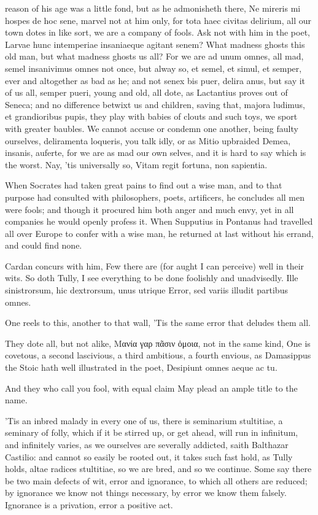 {reason of his age was a little fond, but as he admonisheth there, Ne
mireris mi hospes de hoc sene, marvel not at him only, for tota haec
civitas delirium, all our town dotes in like sort, we are a
company of fools. Ask not with him in the poet, Larvae hunc
intemperiae insaniaeque agitant senem? What madness ghosts this old
man, but what madness ghosts us all? For we are ad unum omnes, all mad,
semel insanivimus omnes not once, but alway so, et semel, et simul, et
semper, ever and altogether as bad as he; and not senex bis puer,
delira anus, but say it of us all, semper pueri, young and old, all
dote, as Lactantius proves out of Seneca; and no difference betwixt us
and children, saving that, majora ludimus, et grandioribus pupis, they
play with babies of clouts and such toys, we sport with greater
baubles. We cannot accuse or condemn one another, being faulty
ourselves, deliramenta loqueris, you talk idly, or as Mitio
upbraided Demea, insanis, auferte, for we are as mad our own selves,
and it is hard to say which is the worst. Nay, 'tis universally so,
Vitam regit fortuna, non sapientia.

When Socrates had taken great pains to find out a wise man, and to
that purpose had consulted with philosophers, poets, artificers, he
concludes all men were fools; and though it procured him both anger and
much envy, yet in all companies he would openly profess it. When 
Supputius in Pontanus had travelled all over Europe to confer with a
wise man, he returned at last without his errand, and could find none.

 Cardan concurs with him, Few there are (for aught I can perceive)
well in their wits. So doth Tully, I see everything to be done
foolishly and unadvisedly.
Ille sinistrorsum, hic dextrorsum, unus utrique
Error, sed variis illudit partibus omnes.

One reels to this, another to that wall,
'Tis the same error that deludes them all.

They dote all, but not alike, Μανία γαρ πᾶσιν ὁμοια, not in the
same kind, One is covetous, a second lascivious, a third ambitious, a
fourth envious, \etc as Damasippus the Stoic hath well illustrated in
the poet,
Desipiunt omnes aeque ac tu.

And they who call you fool, with equal claim
May plead an ample title to the name.

'Tis an inbred malady in every one of us, there is seminarium
stultitiae, a seminary of folly, which if it be stirred up, or get
ahead, will run in infinitum, and infinitely varies, as we ourselves
are severally addicted, saith Balthazar Castilio: and cannot so
easily be rooted out, it takes such fast hold, as Tully holds, altae
radices stultitiae, so we are bred, and so we continue. Some say
there be two main defects of wit, error and ignorance, to which all
others are reduced; by ignorance we know not things necessary, by error
we know them falsely. Ignorance is a privation, error a positive act.

}
